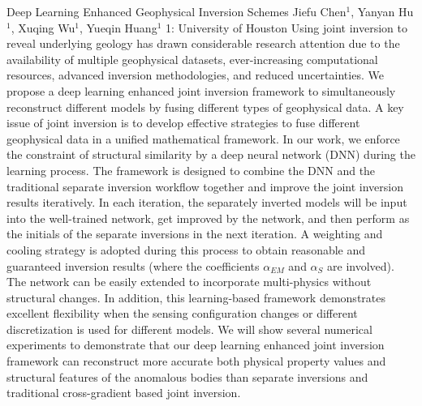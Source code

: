 \vspace{1.5ex}
\abs
{Deep Learning Enhanced Geophysical Inversion Schemes}
{Jiefu Chen$^{1}$, Yanyan Hu$^{1}$, Xuqing Wu$^{1}$, Yueqin Huang$^{1}$}
{1: University of Houston}
{Using joint inversion to reveal underlying geology has drawn considerable research attention due to the availability of multiple geophysical datasets, ever-increasing computational resources, advanced inversion methodologies, and reduced uncertainties. We propose a deep learning enhanced joint inversion framework to simultaneously reconstruct different models by fusing different types of geophysical data. A key issue of joint inversion is to develop effective strategies to fuse different geophysical data in a unified mathematical framework. In our work, we enforce the constraint of structural similarity by a deep neural network (DNN) during the learning process. The framework is designed to combine the DNN and the traditional separate inversion workflow together and improve the joint inversion results iteratively. In each iteration, the separately inverted models will be input into the well-trained network, get improved by the network, and then perform as the initials of the separate inversions in the next iteration. A weighting and cooling strategy is adopted during this process to obtain reasonable and guaranteed inversion results (where the coefficients $\alpha_{EM}$ and $\alpha_S$ are involved). The network can be easily extended to incorporate multi-physics without structural changes. In addition, this learning-based framework demonstrates excellent flexibility when the sensing configuration changes or different discretization is used for different models. We will show several numerical experiments to demonstrate that our deep learning enhanced joint inversion framework can reconstruct more accurate both physical property values and structural features of the anomalous bodies than separate inversions and traditional cross-gradient based joint inversion.}


